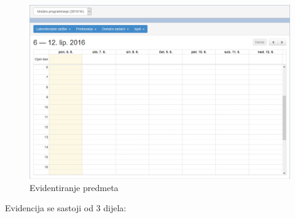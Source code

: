 \documentclass[times, utf8, zavrsni, numeric]{fer}
\begin{document}
\begin{figure}[H]
\centering
\includegraphics[width=\textwidth,height=\textheight,keepaspectratio]{img/evidencija-web.png}
\caption{Evidentiranje predmeta}
\label{fig:evidencija-web}
\end{figure}

Evidencija se sastoji od 3 dijela:
\end{document}
